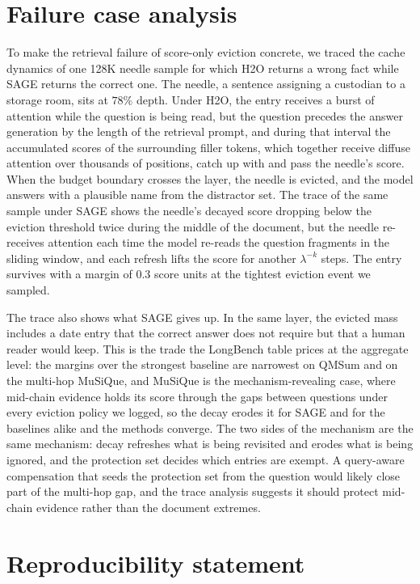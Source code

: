 \needspace{0.3\textheight}
\section{Failure case analysis}\label{app:failure}

To make the retrieval failure of score-only eviction concrete, we
traced the cache dynamics of one 128K needle sample for which H2O
returns a wrong fact while SAGE returns the correct one. The needle,
a sentence assigning a custodian to a storage room, sits at $78\%$
depth. Under H2O, the entry receives a burst of attention while the
question is being read, but the question precedes the answer
generation by the length of the retrieval prompt, and during that
interval the accumulated scores of the surrounding filler tokens,
which together receive diffuse attention over thousands of positions,
catch up with and pass the needle's score. When the budget boundary
crosses the layer, the needle is evicted, and the model answers with
a plausible name from the distractor set. The trace of the same sample
under SAGE shows the needle's decayed score dropping below the
eviction threshold twice during the middle of the document, but the
needle re-receives attention each time the model re-reads the question
fragments in the sliding window, and each refresh lifts the score for
another $\lambda^{-k}$ steps. The entry survives with a margin of
$0.3$ score units at the tightest eviction event we sampled.

The trace also shows what SAGE gives up. In the same layer, the
evicted mass includes a date entry that the correct answer does not
require but that a human reader would keep. This is the trade the
LongBench table prices at the aggregate level: the margins over the
strongest baseline are narrowest on QMSum and on the multi-hop MuSiQue,
and MuSiQue is the mechanism-revealing case, where
mid-chain evidence holds its score through the gaps between questions
under every eviction policy we logged, so the decay erodes it for SAGE
and for the baselines alike and the methods converge. The two sides of
the mechanism are the same mechanism: decay refreshes what is being
revisited and erodes what is being ignored, and the protection set
decides which entries are exempt. A query-aware compensation that
seeds the protection set from the question would likely close part of
the multi-hop gap, and the trace analysis suggests it should protect
mid-chain evidence rather than the document extremes.

\needspace{0.3\textheight}
\section{Reproducibility statement}\label{app:repro}

